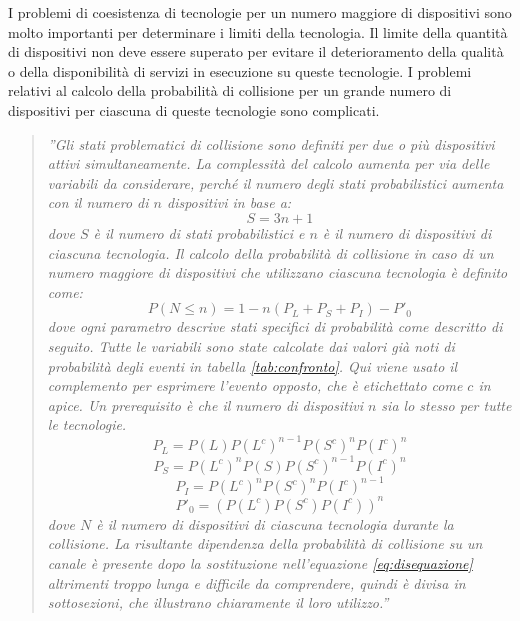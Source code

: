 \documentclass[a4paper]{report} %
\begin{document}
I problemi di coesistenza di tecnologie per un numero maggiore di dispositivi sono molto importanti per determinare i limiti della tecnologia. Il limite della quantità di dispositivi non deve essere superato per evitare il deterioramento della qualità o della disponibilità di servizi in esecuzione su queste tecnologie. 
I problemi relativi al calcolo della probabilità di collisione per un grande numero di dispositivi per ciascuna di queste tecnologie sono complicati. 
\begin{quote}
	\textit{''Gli stati problematici di collisione sono definiti per due o più dispositivi attivi simultaneamente. La complessità del calcolo aumenta per via delle variabili da considerare, perché il numero degli stati probabilistici aumenta con il numero di $n$ dispositivi in base a:
	\begin{equation}
	S = 3n + 1
	\end{equation}
	dove $S$ è il numero di stati probabilistici e $n$ è il numero di dispositivi di ciascuna tecnologia. Il calcolo della probabilità di collisione in caso di un numero maggiore di dispositivi che utilizzano ciascuna tecnologia è definito come:
	\begin{equation}
	\label{eq:disequazione}
	P(N \leq n) = 1 - n(P_L + P_S + P_I) - P'_0
	\end{equation}
	dove ogni parametro descrive stati specifici di probabilità come descritto di seguito. Tutte le variabili sono state calcolate dai valori già noti di probabilità degli eventi in tabella \ref{tab:confronto}. Qui viene usato il complemento per esprimere l'evento opposto, che è etichettato come $c$ in apice. Un prerequisito è che il numero di dispositivi $n$ sia lo stesso per tutte le tecnologie.
	\begin{equation}
	\label{eq:lora}
	P_L = P(L)P(L^c)^{n-1}P(S^c)^nP(I^c)^n
	\end{equation}
	\begin{equation}
	\label{eq:sigfox}
	P_S = P(L^c)^nP(S)P(S^c)^{n-1}P(I^c)^n
	\end{equation}
	\begin{equation}
	\label{eq:iqrf}
	P_I = P(L^c)^nP(S^c)^nP(I^c)^{n-1}
	\end{equation}
	\begin{equation}
	P'_0 = (P(L^c)P(S^c)P(I^c))^n
	\end{equation}
	dove $N$ è il numero di dispositivi di ciascuna tecnologia durante la collisione. La risultante dipendenza della probabilità di collisione su un canale è presente dopo la sostituzione nell'equazione \ref{eq:disequazione} altrimenti troppo lunga e difficile da comprendere, quindi è divisa in sottosezioni, che illustrano chiaramente il loro utilizzo.''}
\end{quote}
\end{document}
